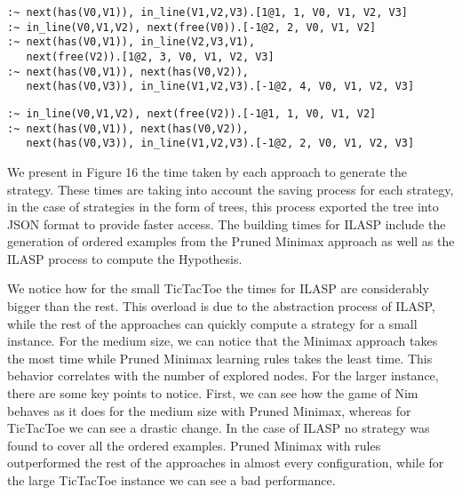 \begin{center}
    \begin{lstlisting}[] 
:~ next(has(V0,V1)), in_line(V1,V2,V3).[1@1, 1, V0, V1, V2, V3]
:~ in_line(V0,V1,V2), next(free(V0)).[-1@2, 2, V0, V1, V2]
:~ next(has(V0,V1)), in_line(V2,V3,V1), 
   next(free(V2)).[1@2, 3, V0, V1, V2, V3]
:~ next(has(V0,V1)), next(has(V0,V2)), 
   next(has(V0,V3)), in_line(V1,V2,V3).[-1@2, 4, V0, V1, V2, V3]
    \end{lstlisting}
\end{center}

\begin{center}
    \begin{lstlisting}[] 
:~ in_line(V0,V1,V2), next(free(V2)).[-1@1, 1, V0, V1, V2]
:~ next(has(V0,V1)), next(has(V0,V2)), 
   next(has(V0,V3)), in_line(V1,V2,V3).[-1@2, 2, V0, V1, V2, V3]
    \end{lstlisting}
\end{center}



We present in Figure 16 the time taken by each approach to generate the strategy. These times are taking into account the saving process for each strategy, in the case of strategies in the form of trees, this process exported the tree into JSON format to provide faster access. The building times for ILASP include the generation of ordered examples from the Pruned Minimax approach as well as the ILASP process to compute the Hypothesis.

We notice how for the small TicTacToe the times for ILASP are considerably bigger than the rest. This overload is due to the abstraction process of ILASP, while the rest of the approaches can quickly compute a strategy for a small instance. For the medium size, we can notice that the Minimax approach takes the most time while Pruned Minimax learning rules takes the least time. This behavior correlates with the number of explored nodes. For the larger instance, there are some key points to notice. First, we can see how the game of Nim behaves as it does for the medium size with Pruned Minimax, whereas for TicTacToe we can see a drastic change. In the case of ILASP no strategy was found to cover all the ordered examples. 
Pruned Minimax with rules outperformed the rest of the approaches in almost every configuration, while for the large TicTacToe instance we can see a bad performance.

